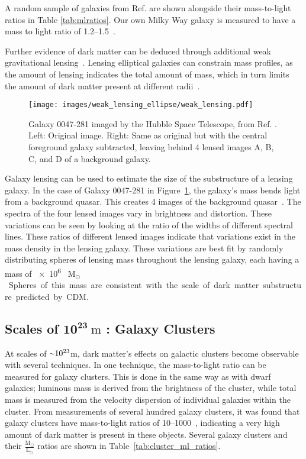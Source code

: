 A random sample of galaxies from Ref. \cite{faber_ml} are shown alongside their mass-to-light ratios in Table \ref{tab:mlratios}.
Our own Milky Way galaxy is measured to have a mass to light ratio of \SIrange{1.2}{1.5}{}~\cite{milkyway_ml_ratio}.

Further evidence of dark matter can be deduced through additional weak gravitational lensing~\cite{weak_lensing_2001}.
Lensing elliptical galaxies can constrain mass profiles, as the amount of lensing indicates the total amount of mass, which in turn limits the amount of dark matter present at different radii~\cite{weak_lensing_ellipse}.

\begin{figure}[!b]
  \centering
  \texttt{[image: images/weak\_lensing\_ellipse/weak\_lensing.pdf]}
  \caption[Weak Lensing with an Ellipse Galaxy]{
    Galaxy 0047-281 imaged by the Hubble Space Telescope, from Ref. \cite{weak_lensing_ellipse}.
    Left: Original image.
    Right: Same as original but with the central foreground galaxy subtracted, leaving behind 4 lensed images A, B, C, and D of a background galaxy.
  }
  \label{fig:ellipse}
\end{figure}
    
Galaxy lensing can be used to estimate the size of the substructure of a lensing galaxy.
In the case of Galaxy 0047-281 in Figure~\ref{fig:ellipse}, the galaxy's mass bends light from a background quasar.
This creates 4 images of the background quasar~\cite{weak_lensing_quasar}.
The spectra of the four lensed images vary in brightness and distortion.
These variations can be seen by looking at the ratio of the widths of different spectral lines.
These ratios of different lensed images indicate that variations exist in the mass density in the lensing galaxy.
These variations are best fit by randomly distributing spheres of lensing mass throughout the lensing galaxy, each having a mass of \SI{e6}{ M${{}_\odot}$ }.
Spheres of this mass are consistent with the scale of dark matter substructure predicted by CDM.

\subsection[Scales of $10^{23}\:\text{m}$ : Galaxy Clusters]{Scales of $\mathbf{10^{23}}\:\text{m}$ : Galaxy Clusters}\label{dm_galclusters}
%
At scales of $\nicetilde 10^{23}$m, dark matter's effects on galactic clusters become observable with several techniques.
In one technique, the mass-to-light ratio can be measured for galaxy clusters.
This is done in the same way as with dwarf galaxies; luminous mass is derived from the brightness of the cluster, while total mass is measured from the velocity dispersion of individual galaxies within the cluster.
From measurements of several hundred galaxy clusters, it was found that galaxy clusters have mass-to-light ratios of \SIrange{10}{1000}{}~\cite{cluster_ml_ratios}, indicating a very high amount of dark matter is present in these objects.
Several galaxy clusters and their $\frac{\textrm{M}_\odot}{\textrm{L}_\odot}$ ratios are shown in Table~\ref{tab:cluster_ml_ratios}.

